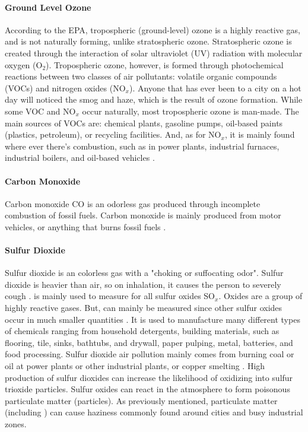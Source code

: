 \paragraph{Ground Level Ozone}
According to the EPA, tropospheric (ground-level) ozone \ozone is a highly
reactive gas, and is not naturally forming, unlike stratospheric ozone.
Stratospheric ozone is created through the interaction of solar ultraviolet
(UV) radiation with molecular oxygen (O$_2$). Tropospheric ozone, however, is
formed through photochemical reactions between two classes of air pollutants:
volatile organic compounds (VOCs) and nitrogen oxides (NO$_x$). Anyone that has
ever been to a city on a hot day will noticed the smog and haze, which is the
result of ozone formation. While some VOC and NO$_x$ occur naturally, most
tropospheric ozone is man-made. The main sources of VOCs are: chemical plants,
gasoline pumps, oil-based paints (plastics, petroleum), or recycling facilities.
And, as for NO$_x$, it is mainly found where ever there's combustion, such as
in power plants, industrial furnaces, industrial boilers, and oil-based vehicles
\cite{epa-what-is-ozone}.

\paragraph{Carbon Monoxide}
Carbon monoxide CO is an odorless gas produced through incomplete combustion of
fossil fuels. Carbon monoxide is mainly produced from motor vehicles, or
anything that burns fossil fuels \cite{health-impacts-air-pollution-review}.

\paragraph{Sulfur Dioxide}
Sulfur dioxide \sdo is an colorless gas with a "choking or suffocating odor".
Sulfur dioxide is heavier than air, so on inhalation, it causes the person to
severely cough \cite{pubchem-so2}. \sdo is mainly used to measure for all sulfur
oxides SO$_x$. Oxides are a group of highly reactive gases. But, \sdo can mainly
be measured since other sulfur oxides occur in much smaller quantities
\cite{epa-so2-basics}. It is used to manufacture many different types of
chemicals ranging from household detergents, building materials, such as
flooring, tile, sinks, bathtubs, and drywall, paper pulping, metal, batteries,
and food processing. Sulfur dioxide air pollution mainly comes from burning coal
or oil at power plants or other industrial plants, or copper smelting
\cite{pubchem-so2}. High production of sulfur dioxides can increase the
likelihood of \sdo oxidizing into sulfur trioxide \sto particles. Sulfur oxides
\sox can react in the atmosphere to form poisonous particulate matter
(particles). As previously mentioned, particulate matter (including \sox) can
cause haziness commonly found around cities and busy industrial zones.

